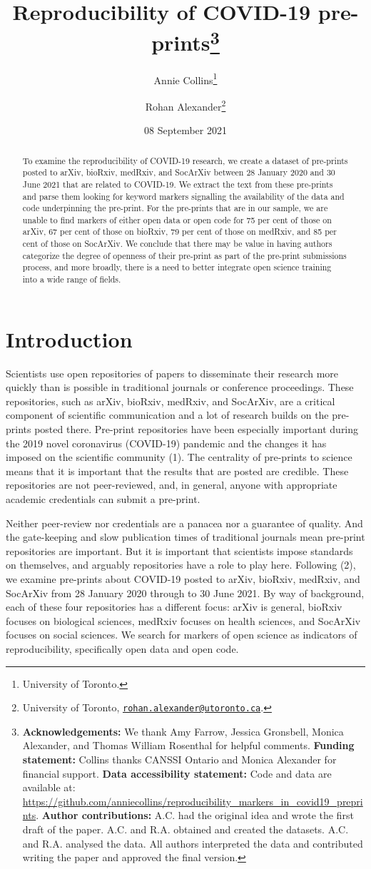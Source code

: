 \documentclass[
]{article}
\title{Reproducibility of COVID-19 pre-prints\thanks{\textbf{Acknowledgements:} We thank Amy Farrow, Jessica Gronsbell, Monica Alexander, and Thomas William Rosenthal for helpful comments. \textbf{Funding statement:} Collins thanks CANSSI Ontario and Monica Alexander for financial support. \textbf{Data accessibility statement:} Code and data are available at: \url{https://github.com/anniecollins/reproducibility_markers_in_covid19_preprints}. \textbf{Author contributions:} A.C. had the original idea and wrote the first draft of the paper. A.C. and R.A. obtained and created the datasets. A.C. and R.A. analysed the data. All authors interpreted the data and contributed writing the paper and approved the final version.}}
\author{Annie Collins\footnote{University of Toronto.} \and Rohan Alexander\footnote{University of Toronto, \href{mailto:rohan.alexander@utoronto.ca}{\nolinkurl{rohan.alexander@utoronto.ca}}.}}
\date{08 September 2021}
\begin{document}
\maketitle
\begin{abstract}
To examine the reproducibility of COVID-19 research, we create a dataset of pre-prints posted to arXiv, bioRxiv, medRxiv, and SocArXiv between 28 January 2020 and 30 June 2021 that are related to COVID-19. We extract the text from these pre-prints and parse them looking for keyword markers signalling the availability of the data and code underpinning the pre-print. For the pre-prints that are in our sample, we are unable to find markers of either open data or open code for 75 per cent of those on arXiv, 67 per cent of those on bioRxiv, 79 per cent of those on medRxiv, and 85 per cent of those on SocArXiv. We conclude that there may be value in having authors categorize the degree of openness of their pre-print as part of the pre-print submissions process, and more broadly, there is a need to better integrate open science training into a wide range of fields.
\end{abstract}

\hypertarget{introduction}{%
\section{Introduction}\label{introduction}}

Scientists use open repositories of papers to disseminate their research more quickly than is possible in traditional journals or conference proceedings. These repositories, such as arXiv, bioRxiv, medRxiv, and SocArXiv, are a critical component of scientific communication and a lot of research builds on the pre-prints posted there. Pre-print repositories have been especially important during the 2019 novel coronavirus (COVID-19) pandemic and the changes it has imposed on the scientific community (1). The centrality of pre-prints to science means that it is important that the results that are posted are credible. These repositories are not peer-reviewed, and, in general, anyone with appropriate academic credentials can submit a pre-print.

Neither peer-review nor credentials are a panacea nor a guarantee of quality. And the gate-keeping and slow publication times of traditional journals mean pre-print repositories are important. But it is important that scientists impose standards on themselves, and arguably repositories have a role to play here. Following (2), we examine pre-prints about COVID-19 posted to arXiv, bioRxiv, medRxiv, and SocArXiv from 28 January 2020 through to 30 June 2021. By way of background, each of these four repositories has a different focus: arXiv is general, bioRxiv focuses on biological sciences, medRxiv focuses on health sciences, and SocArXiv focuses on social sciences. We search for markers of open science as indicators of reproducibility, specifically open data and open code.
\end{document}
